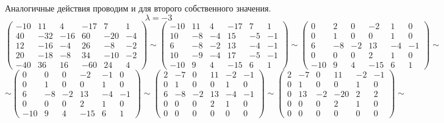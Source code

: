\documentclass{article}
\newcommand{\la}{\lambda}
\begin{document}
Аналогичные действия проводим и для второго собственного значения.
$$\la = -3$$
$$\left(\begin{array}{ccccc|c}
-10 & 11 & 4 & -17 & 7 & 1 \\
40 & -32 & -16 & 60 & -20 & -4 \\
12 & -16 & -4 & 26 & -8 & -2 \\
20 & -18 & -8 & 34 & -10 & -2 \\
-40 & 36 & 16 & -60 & 24 & 4
\end{array}\right) \sim \left(\begin{array}{ccccc|c}
-10 & 11 & 4 & -17 & 7 & 1 \\
10 & -8 & -4 & 15 & -5 & -1 \\
6 & -8 & -2 & 13 & -4 & -1 \\
10 & -9 & -4 & 17 & -5 & -1 \\
-10 & 9 & 4 & -15 & 6 & 1
\end{array}\right) \sim \left(\begin{array}{ccccc|c}
0 & 2 & 0 & -2 & 1 & 0 \\
0 & 1 & 0 & 0 & 1 & 0 \\
6 & -8 & -2 & 13 & -4 & -1 \\
0 & 0 & 0 & 2 & 1 & 0 \\
-10 & 9 & 4 & -15 & 6 & 1
\end{array}\right) \sim $$
$$\sim \left(\begin{array}{ccccc|c}
0 & 0 & 0 & -2 & -1 & 0 \\
0 & 1 & 0 & 0 & 1 & 0 \\
6 & -8 & -2 & 13 & -4 & -1 \\
0 & 0 & 0 & 2 & 1 & 0 \\
-10 & 9 & 4 & -15 & 6 & 1
\end{array}\right)\sim \left(\begin{array}{ccccc|c}
2 & -7 & 0 & 11 & -2 & -1 \\
0 & 1 & 0 & 0 & 1 & 0 \\
6 & -8 & -2 & 13 & -4 & -1 \\
0 & 0 & 0 & 2 & 1 & 0 \\
0 & 0 & 0 & 0 & 0 & 0
\end{array}\right)\sim \left(\begin{array}{ccccc|c}
2 & -7 & 0 & 11 & -2 & -1 \\
0 & 1 & 0 & 0 & 1 & 0 \\
0 & 13 & -2 & -20 & 2 & 2 \\
0 & 0 & 0 & 2 & 1 & 0 \\
0 & 0 & 0 & 0 & 0 & 0
\end{array}\right)\sim$$
\end{document}
